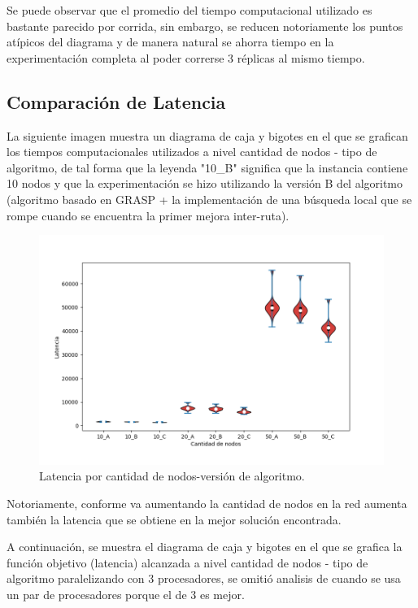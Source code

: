 \documentclass[review]{elsarticle}
\begin{document}
Se puede observar que el promedio del tiempo computacional utilizado es bastante parecido por corrida, sin embargo, se reducen notoriamente los puntos atípicos del diagrama y de manera natural se ahorra tiempo en la experimentación completa al poder correrse 3 réplicas al mismo tiempo. 

\subsection{Comparación de Latencia}

La siguiente imagen muestra un diagrama de caja y bigotes en el que se grafican los tiempos computacionales utilizados a nivel cantidad de nodos - tipo de algoritmo, de tal forma que la leyenda "10\_B" significa que la instancia contiene 10 nodos y que la experimentación se hizo utilizando la versión B del algoritmo (algoritmo basado en GRASP + la implementación de una búsqueda local que se rompe cuando se encuentra la primer mejora inter-ruta).

	 \begin{figure}[h!]
	\centering
	\includegraphics[width=0.7\linewidth]{latencia.png}
	\caption{Latencia por cantidad de nodos-versión de algoritmo.}
	\label{fig:imagen3}
	
	\end{figure}

Notoriamente, conforme va aumentando la cantidad de nodos en la red aumenta también la latencia que se obtiene en la mejor solución encontrada. 

A continuación, se muestra el diagrama de caja y bigotes en el que se grafica la función objetivo (latencia) alcanzada a nivel cantidad de nodos - tipo de algoritmo paralelizando con 3 procesadores, se omitió analisis de cuando se usa un par de procesadores porque el de 3 es mejor.
\end{document}
